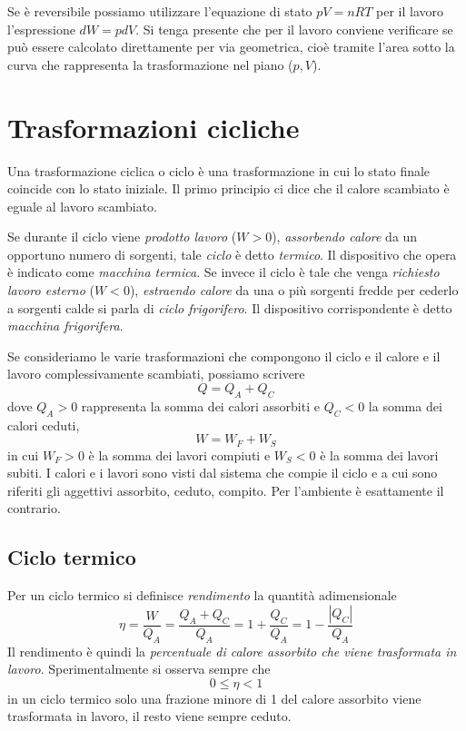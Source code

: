 \documentclass[class=book, crop=false, oneside, 12pt]{standalone}
\begin{document}
Se è reversibile possiamo utilizzare l'equazione di stato \(p V= n R T\) per il lavoro l'espressione \(d W = p d V \). 
Si tenga presente che per il lavoro conviene verificare se può essere calcolato direttamente per via geometrica, cioè tramite l'area sotto la curva che rappresenta la trasformazione nel piano (\(p , V\)).

\section{Trasformazioni cicliche}

Una trasformazione ciclica o ciclo è una trasformazione in cui lo stato finale coincide con lo stato iniziale. 
Il primo principio ci dice che il calore scambiato è eguale al lavoro scambiato.

Se durante il ciclo viene \emph{prodotto lavoro} (\(W > 0 \)), \emph{assorbendo calore} da un opportuno numero di sorgenti, tale \emph{ciclo} è detto \emph{termico}. 
Il dispositivo che opera è indicato come \emph{macchina termica}. 
Se invece il ciclo è tale che venga \emph{richiesto lavoro esterno} (\(W < 0\)), \emph{estraendo calore} da una o più sorgenti fredde per cederlo a sorgenti calde si parla di \emph{ciclo frigorifero}. 
Il dispositivo corrispondente è detto \emph{macchina frigorifera}. 

Se consideriamo le varie trasformazioni che compongono il ciclo e il calore e il lavoro complessivamente scambiati, possiamo scrivere 
\begin{equation*}
    Q = Q_A +Q_C
\end{equation*}
dove \(Q_A>0\) rappresenta la somma dei calori assorbiti e \(Q_C<0\) la somma dei calori ceduti,
\begin{equation*}
    W = W_F + W_S
\end{equation*}
in cui \(W_F >0\) è la somma dei lavori compiuti e \(W_S < 0\) è la somma dei lavori subiti.
I calori e i lavori sono visti dal sistema che compie il ciclo e a cui sono riferiti gli aggettivi assorbito, ceduto, compito. 
Per l'ambiente è esattamente il contrario.

\subsection{Ciclo termico}

Per un ciclo termico si definisce \emph{rendimento} la quantità adimensionale 
\begin{equation}
    \eta = \frac{W}{Q_A} = \frac{Q_A + Q_C}{Q_A} = 1+ \frac{Q_C}{Q_A} = 1 - \frac{|Q_C|}{Q_A}
\end{equation}
Il rendimento è quindi la \emph{percentuale di calore assorbito che viene trasformata in lavoro}.
Sperimentalmente si osserva sempre che
\begin{equation*}
    0 \leq \eta < 1
\end{equation*}
in un ciclo termico solo una frazione minore di 1 del calore assorbito viene trasformata in lavoro, il resto viene sempre ceduto.
\end{document}

